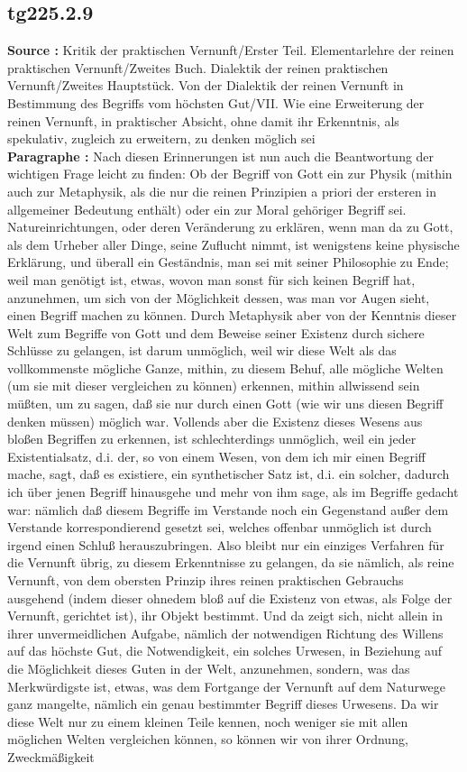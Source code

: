 \documentclass[a4paper,12pt,twoside]{book}
\begin{document}
	\subsection*{tg225.2.9} 
	\textbf{Source : }Kritik der praktischen Vernunft/Erster Teil. Elementarlehre der reinen praktischen Vernunft/Zweites Buch. Dialektik der reinen praktischen Vernunft/Zweites Hauptstück. Von der Dialektik der reinen Vernunft in Bestimmung des Begriffs vom höchsten Gut/VII. Wie eine Erweiterung der reinen Vernunft, in praktischer Absicht, ohne damit ihr Erkenntnis, als spekulativ, zugleich zu erweitern, zu denken möglich sei\\  
	
	\textbf{Paragraphe : }Nach diesen Erinnerungen ist nun auch die Beantwortung der wichtigen Frage leicht zu finden: Ob der Begriff von Gott ein zur Physik (mithin auch zur Metaphysik, als die nur die reinen Prinzipien a priori der ersteren in allgemeiner  Bedeutung enthält) oder ein zur Moral gehöriger Begriff sei. Natureinrichtungen, oder deren Veränderung zu erklären, wenn man da zu Gott, als dem Urheber aller Dinge, seine Zuflucht nimmt, ist wenigstens keine physische Erklärung, und überall ein Geständnis, man sei mit seiner Philosophie zu Ende; weil man genötigt ist, etwas, wovon man sonst für sich keinen Begriff hat, anzunehmen, um sich von der Möglichkeit dessen, was man vor Augen sieht, einen Begriff machen zu können. Durch Metaphysik aber von der Kenntnis dieser Welt zum Begriffe von Gott und dem Beweise seiner Existenz durch sichere Schlüsse zu gelangen, ist darum unmöglich, weil wir diese Welt als das vollkommenste mögliche Ganze, mithin, zu diesem Behuf, alle mögliche Welten (um sie mit dieser vergleichen zu können) erkennen, mithin allwissend sein müßten, um zu sagen, daß sie nur durch einen Gott (wie wir uns diesen Begriff denken müssen) möglich war. Vollends aber die Existenz dieses Wesens aus bloßen Begriffen zu erkennen, ist schlechterdings unmöglich, weil ein jeder Existentialsatz, d.i. der, so von einem Wesen, von dem ich mir einen Begriff mache, sagt, daß es existiere, ein synthetischer Satz ist, d.i. ein solcher, dadurch ich über jenen Begriff hinausgehe und mehr von ihm sage, als im Begriffe gedacht war: nämlich daß diesem Begriffe im Verstande noch ein Gegenstand außer dem Verstande korrespondierend gesetzt sei, welches offenbar unmöglich ist durch irgend einen Schluß herauszubringen. Also bleibt nur ein einziges Verfahren für die Vernunft übrig, zu diesem Erkenntnisse zu gelangen, da sie nämlich, als reine Vernunft, von dem obersten Prinzip ihres reinen praktischen Gebrauchs ausgehend (indem dieser ohnedem bloß auf die Existenz von etwas, als Folge der Vernunft, gerichtet ist), ihr Objekt bestimmt. Und da zeigt sich, nicht allein in ihrer unvermeidlichen Aufgabe, nämlich der notwendigen Richtung des Willens auf das höchste Gut, die Notwendigkeit, ein solches Urwesen, in Beziehung auf die Möglichkeit dieses Guten in der Welt, anzunehmen, sondern, was das Merkwürdigste ist, etwas, was dem Fortgange der Vernunft auf dem Naturwege ganz  mangelte, nämlich ein genau bestimmter Begriff dieses Urwesens. Da wir diese Welt nur zu einem kleinen Teile kennen, noch weniger sie mit allen möglichen Welten vergleichen können, so können wir von ihrer Ordnung, Zweckmäßigkeit 
\end{document}

